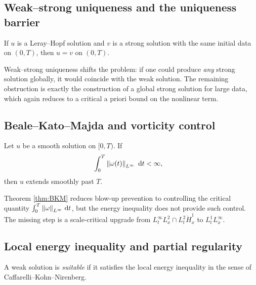 \subsection{Weak--strong uniqueness and the uniqueness barrier}
\begin{theorem}
If $u$ is a Leray--Hopf solution and $v$ is a strong solution with the same initial data on $(0,T)$,
then $u=v$ on $(0,T)$.
\end{theorem}

\begin{proposition}\label{prop:uniqueness-wall}
Weak--strong uniqueness shifts the problem: if one could produce \emph{any} strong solution globally,
it would coincide with the weak solution. The remaining obstruction is exactly the construction of
a global strong solution for large data, which again reduces to a critical a priori bound on
the nonlinear term.
\end{proposition}

\subsection{Beale--Kato--Majda and vorticity control}
\begin{theorem}\label{thm:BKM}
Let $u$ be a smooth solution on $[0,T)$. If
\[
\int_0^T \left\lVert \omega(t)\right\rVert_{L^\infty}\,\,\mathrm{d} t <\infty,
\]
then $u$ extends smoothly past $T$.
\end{theorem}

\begin{proposition}\label{prop:bkm-wall}
Theorem \ref{thm:BKM} reduces blow-up prevention to controlling the critical quantity
$\int_0^T \left\lVert \omega\right\rVert_{L^\infty}\,\mathrm{d} t$, but the energy inequality does not provide such control.
The missing step is a scale-critical upgrade from $L^\infty_t L^2_x\cap L^2_t \dot H^1_x$
to $L^1_t L^\infty_x$.
\end{proposition}

\subsection{Local energy inequality and partial regularity}
\begin{definition}
A weak solution is \emph{suitable} if it satisfies the local energy inequality in the sense of
Caffarelli--Kohn--Nirenberg.
\end{definition}

